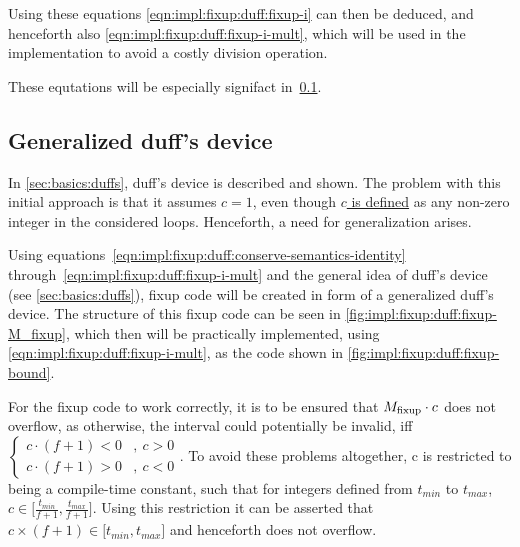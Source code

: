 Using these equations \cref{eqn:impl:fixup:duff:fixup-i} can then be deduced, and henceforth also \cref{eqn:impl:fixup:duff:fixup-i-mult}, which will be used in the implementation to avoid a costly division operation.

These equtations will be especially signifact in~\cref{sec:impl:fixup:duff}.

\subsection{Generalized duff's device}\label{sec:impl:fixup:duff}

In \cref{sec:basics:duffs}, duff's device is described and shown.
The problem with this initial approach is that it assumes $c = 1$, even though \hyperref[sec:impl::def-c]{$c$ is defined} as any non-zero integer in the considered loops.
Henceforth, a need for generalization arises.

Using equations~\ref{eqn:impl:fixup:duff:conserve-semantics-identity} through~\ref{eqn:impl:fixup:duff:fixup-i-mult} and the general idea of duff's device (see \cref{sec:basics:duffs}), fixup code will be created in form of a generalized duff's device.
The structure of this fixup code can be seen in \cref{fig:impl:fixup:duff:fixup-M_fixup}, which then will be practically implemented, using \cref{eqn:impl:fixup:duff:fixup-i-mult}, as the code shown in \cref{fig:impl:fixup:duff:fixup-bound}.





For the fixup code to work correctly, it is to be ensured that $M_{\text{fixup}} \cdot c$ does not overflow, as otherwise, the interval \cinterval could potentially be invalid, iff $
\begin{cases}
    c \cdot (f + 1) < 0 &, \medspace c > 0\\
    c \cdot (f + 1) > 0 &, \medspace c < 0
\end{cases}$.
To avoid these problems altogether, c is restricted to being a compile-time constant, such that for integers defined from $t_{min}$ to $t_{max}$, $c \in \lbrack \frac{t_{min}}{f + 1}, \frac{t_{max}}{f + 1} \rbrack$.
Using this restriction it can be asserted that $c \times (f + 1) \in \lbrack t_{min}, t_{max} \rbrack$ and henceforth does not overflow.

